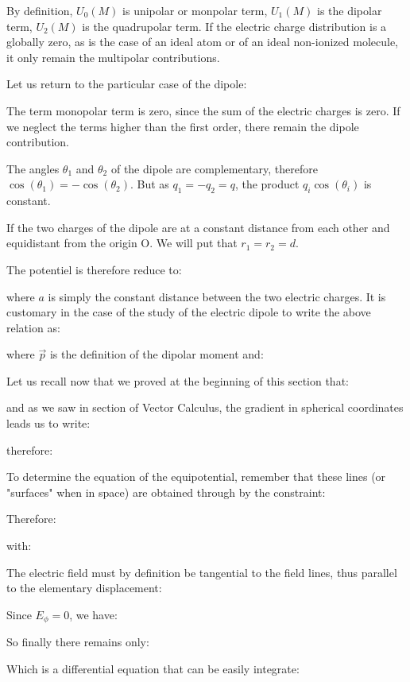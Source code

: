 	By definition, $U_0(M)$ is unipolar or monpolar term, $U_1(M)$ is the dipolar term, $U_2(M)$ is the quadrupolar term. If the electric charge distribution is a globally zero, as is the case of an ideal atom or of an ideal non-ionized molecule, it only remain the multipolar contributions.
	
	Let us return to the particular case of the dipole:
	
	The term monopolar term is zero, since the sum of the electric charges is zero. If we neglect the terms higher than the first order, there remain the dipole contribution.
	
	The angles $\theta_1$ and $\theta_2$ of the dipole are complementary, therefore $\cos(\theta_1)=-\cos(\theta_2)$. But as $q_1=-q_2=q$, the product $q_i\cos(\theta_i)$ is constant.
	
	If the two charges of the dipole are at a constant distance from each other and equidistant from the origin O. We will put that $r_1=r_2=d$.

	The potentiel is therefore reduce to:
	
	
	where $a$ is simply the constant distance between the two electric charges.
	It is customary in the case of the study of the electric dipole to write the above relation as:
	
	where $\vec{p}$ is the definition of the dipolar moment and:
	
	Let us recall now that we proved at the beginning of this section that:
	
	and as we saw in section of Vector Calculus, the gradient in spherical coordinates leads us to write:
	
	therefore:
	
	To determine the equation of the equipotential, remember that these lines (or "surfaces" when in space) are obtained through by the constraint:
	
	Therefore:
	
	with:
	
	The electric field must by definition be tangential to the field lines, thus parallel to the elementary displacement:
	
	Since $E_\phi=0$, we have:
	
	So finally there remains only:
	
	Which is a differential equation that can be easily integrate:
	
